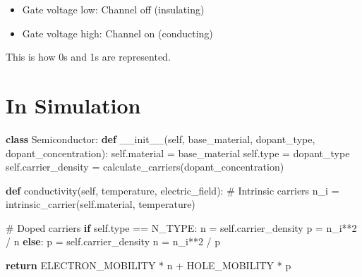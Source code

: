 \documentclass[
  11pt,
  letterpaper,
  twoside,
  openright]{book}
\newenvironment{Shaded}{\begin{snugshade}}{\end{snugshade}}
\newcommand{\BuiltInTok}[1]{\textcolor[rgb]{0.00,0.23,0.31}{#1}}
\newcommand{\CommentTok}[1]{\textcolor[rgb]{0.37,0.37,0.37}{#1}}
\newcommand{\ControlFlowTok}[1]{\textcolor[rgb]{0.00,0.23,0.31}{\textbf{#1}}}
\newcommand{\DecValTok}[1]{\textcolor[rgb]{0.68,0.00,0.00}{#1}}
\newcommand{\FunctionTok}[1]{\textcolor[rgb]{0.28,0.35,0.67}{#1}}
\newcommand{\KeywordTok}[1]{\textcolor[rgb]{0.00,0.23,0.31}{\textbf{#1}}}
\newcommand{\NormalTok}[1]{\textcolor[rgb]{0.00,0.23,0.31}{#1}}
\newcommand{\OperatorTok}[1]{\textcolor[rgb]{0.37,0.37,0.37}{#1}}
\newcommand{\VariableTok}[1]{\textcolor[rgb]{0.07,0.07,0.07}{#1}}
\providecommand{\tightlist}{%
  \setlength{\itemsep}{0pt}\setlength{\parskip}{0pt}}
\begin{document}
\begin{itemize}
\tightlist
\item
  Gate voltage low: Channel off (insulating)
\item
  Gate voltage high: Channel on (conducting)
\end{itemize}

This is how 0s and 1s are represented.

\section{In Simulation}\label{in-simulation-5}

\begin{Shaded}
\begin{Highlighting}[]
\KeywordTok{class}\NormalTok{ Semiconductor:}
    \KeywordTok{def} \FunctionTok{\_\_init\_\_}\NormalTok{(}\VariableTok{self}\NormalTok{, base\_material, dopant\_type, dopant\_concentration):}
        \VariableTok{self}\NormalTok{.material }\OperatorTok{=}\NormalTok{ base\_material}
        \VariableTok{self}\NormalTok{.}\BuiltInTok{type} \OperatorTok{=}\NormalTok{ dopant\_type}
        \VariableTok{self}\NormalTok{.carrier\_density }\OperatorTok{=}\NormalTok{ calculate\_carriers(dopant\_concentration)}

    \KeywordTok{def}\NormalTok{ conductivity(}\VariableTok{self}\NormalTok{, temperature, electric\_field):}
        \CommentTok{\# Intrinsic carriers}
\NormalTok{        n\_i }\OperatorTok{=}\NormalTok{ intrinsic\_carrier(}\VariableTok{self}\NormalTok{.material, temperature)}

        \CommentTok{\# Doped carriers}
        \ControlFlowTok{if} \VariableTok{self}\NormalTok{.}\BuiltInTok{type} \OperatorTok{==}\NormalTok{ N\_TYPE:}
\NormalTok{            n }\OperatorTok{=} \VariableTok{self}\NormalTok{.carrier\_density}
\NormalTok{            p }\OperatorTok{=}\NormalTok{ n\_i}\OperatorTok{**}\DecValTok{2} \OperatorTok{/}\NormalTok{ n}
        \ControlFlowTok{else}\NormalTok{:}
\NormalTok{            p }\OperatorTok{=} \VariableTok{self}\NormalTok{.carrier\_density}
\NormalTok{            n }\OperatorTok{=}\NormalTok{ n\_i}\OperatorTok{**}\DecValTok{2} \OperatorTok{/}\NormalTok{ p}

        \ControlFlowTok{return}\NormalTok{ ELECTRON\_MOBILITY }\OperatorTok{*}\NormalTok{ n }\OperatorTok{+}\NormalTok{ HOLE\_MOBILITY }\OperatorTok{*}\NormalTok{ p}
\end{Highlighting}
\end{Shaded}
\end{document}
